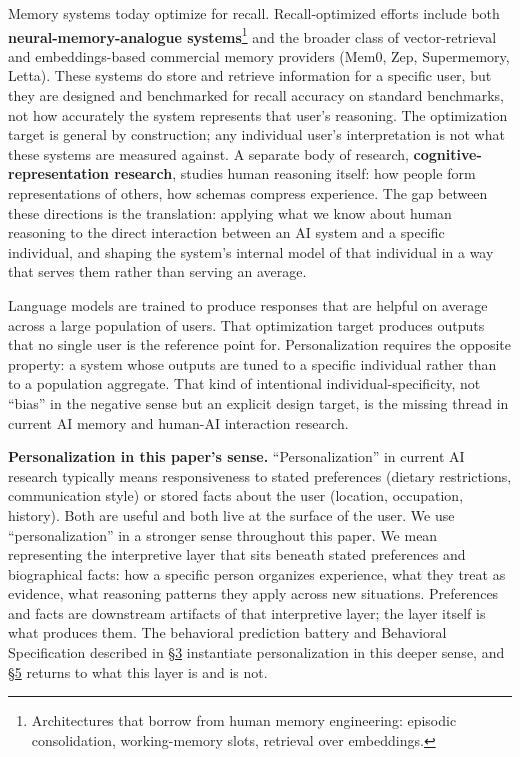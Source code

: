 Memory systems today optimize for recall. Recall-optimized efforts
include both \textbf{neural-memory-analogue systems}\footnote{Architectures
  that borrow from human memory engineering: episodic consolidation,
  working-memory slots, retrieval over embeddings.} and the broader
class of vector-retrieval and embeddings-based commercial memory
providers (Mem0, Zep, Supermemory, Letta). These systems do store and
retrieve information for a specific user, but they are designed and
benchmarked for recall accuracy on standard benchmarks, not how
accurately the system represents that user's reasoning. The optimization
target is general by construction; any individual user's interpretation
is not what these systems are measured against. A separate body of
research, \textbf{cognitive-representation research}, studies human
reasoning itself: how people form representations of others, how schemas
compress experience. The gap between these directions is the
translation: applying what we know about human reasoning to the direct
interaction between an AI system and a specific individual, and shaping
the system's internal model of that individual in a way that serves them
rather than serving an average.

Language models are trained to produce responses that are helpful on
average across a large population of users. That optimization target
produces outputs that no single user is the reference point for.
Personalization requires the opposite property: a system whose outputs
are tuned to a specific individual rather than to a population
aggregate. That kind of intentional individual-specificity, not ``bias''
in the negative sense but an explicit design target, is the missing
thread in current AI memory and human-AI interaction research.

\textbf{Personalization in this paper's sense.} ``Personalization'' in
current AI research typically means responsiveness to stated preferences
(dietary restrictions, communication style) or stored facts about the
user (location, occupation, history). Both are useful and both live at
the surface of the user. We use ``personalization'' in a stronger sense
throughout this paper. We mean representing the interpretive layer that
sits beneath stated preferences and biographical facts: how a specific
person organizes experience, what they treat as evidence, what reasoning
patterns they apply across new situations. Preferences and facts are
downstream artifacts of that interpretive layer; the layer itself is
what produces them. The behavioral prediction battery and Behavioral
Specification described in \hyperref[study-design]{§3} instantiate personalization in this deeper
sense, and \hyperref[discussion]{§5} returns to what this layer is and is not.

